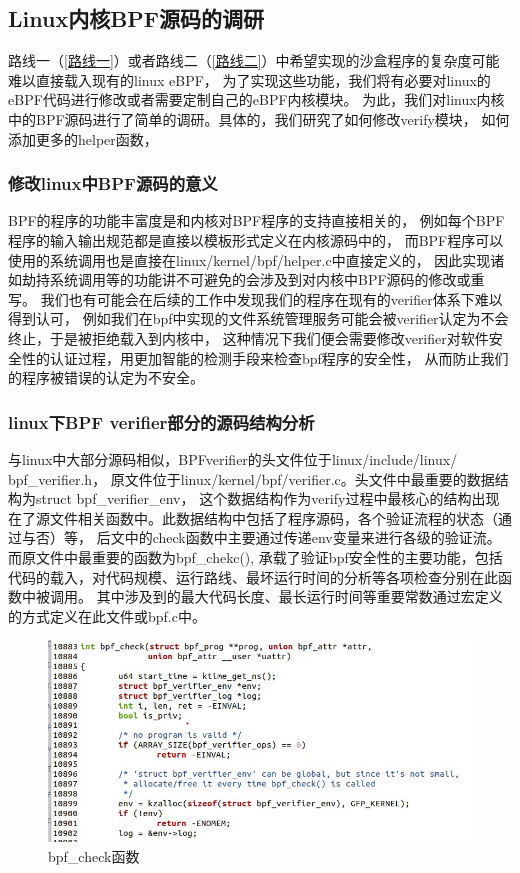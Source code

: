 \documentclass[AutoFakeBold,a4paper]{ctexart}
\begin{document}
\subsection{Linux内核BPF源码的调研}
路线一（\ref{路线一}）或者路线二（\ref{路线二}）中希望实现的沙盒程序的复杂度可能难以直接载入现有的linux eBPF，
为了实现这些功能，我们将有必要对linux的eBPF代码进行修改或者需要定制自己的eBPF内核模块。
为此，我们对linux内核中的BPF源码进行了简单的调研。具体的，我们研究了如何修改verify模块，
如何添加更多的helper函数，
\subsubsection{修改linux中BPF源码的意义}
BPF的程序的功能丰富度是和内核对BPF程序的支持直接相关的，
例如每个BPF程序的输入输出规范都是直接以模板形式定义在内核源码中的，
而BPF程序可以使用的系统调用也是直接在{\ttfamily linux/kernel/bpf/helper.c}中直接定义的，
因此实现诸如劫持系统调用等的功能讲不可避免的会涉及到对内核中BPF源码的修改或重写。
我们也有可能会在后续的工作中发现我们的程序在现有的verifier体系下难以得到认可，
例如我们在bpf中实现的文件系统管理服务可能会被verifier认定为不会终止，于是被拒绝载入到内核中，
这种情况下我们便会需要修改verifier对软件安全性的认证过程，用更加智能的检测手段来检查bpf程序的安全性，
从而防止我们的程序被错误的认定为不安全。
\subsubsection{linux下BPF verifier部分的源码结构分析}
与linux中大部分源码相似，BPFverifier的头文件位于{\ttfamily linux/include/linux/\\bpf\_verifier.h}，
原文件位于{\ttfamily linux/kernel/bpf/verifier.c}。头文件中最重要的数据结构为{\ttfamily struct bpf\_verifier\_env}，
这个数据结构作为verify过程中最核心的结构出现在了源文件相关函数中。此数据结构中包括了程序源码，各个验证流程的状态（通过与否）等，
后文中的{\ttfamily check}函数中主要通过传递{\ttfamily env}变量来进行各级的验证流。而原文件中最重要的函数为{\ttfamily bpf\_chekc()},
承载了验证bpf安全性的主要功能，包括代码的载入，对代码规模、运行路线、最坏运行时间的分析等各项检查分别在此函数中被调用。
其中涉及到的最大代码长度、最长运行时间等重要常数通过宏定义的方式定义在此文件或{\ttfamily bpf.c}中。
\begin{figure}[H]
    \centering
    \includegraphics[width=0.9\columnwidth]{../LvHongtao/pic_2.jpg}
    \caption{{\ttfamily bpf\_check}函数}
\end{figure}
\end{document}
